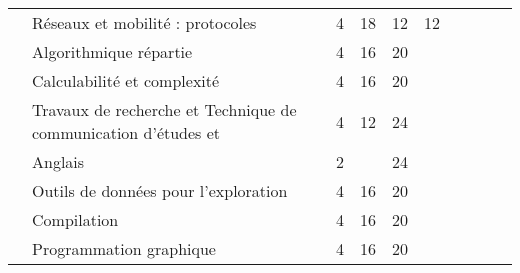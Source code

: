 \begin{tabular}{c|m{6cm}|cm{1cm}|cm{1cm}|cm{1cm}|cm{1cm}|}
 & \color{black} \mbox{Réseaux} \mbox{et} \mbox{mobilité} \mbox{:} \mbox{protocoles}  & \color{black} 4 & \color{black} 18 & \color{black} 12 & \color{black} 12 \\ \cline{2-6}
 & \cellcolor{couleurClaire} \color{couleurTexte} \mbox{Algorithmique} \mbox{répartie}  & \cellcolor{couleurClaire} \color{couleurTexte} 4 & \cellcolor{couleurClaire} \color{couleurTexte} 16 & \cellcolor{couleurClaire} \color{couleurTexte} 20 & \cellcolor{couleurClaire} \color{couleurTexte}  \\ \cline{2-6}
 & \color{black} \mbox{Calculabilité} \mbox{et} \mbox{complexité}  & \color{black} 4 & \color{black} 16 & \color{black} 20 & \color{black}  \\ \cline{2-6}
 & \cellcolor{couleurClaire} \color{couleurTexte} \mbox{Travaux} \mbox{de} \mbox{recherche} \mbox{et} \mbox{Technique} \mbox{de} \mbox{communication} \mbox{d’études} \mbox{et}  & \cellcolor{couleurClaire} \color{couleurTexte} 4 & \cellcolor{couleurClaire} \color{couleurTexte} 12 & \cellcolor{couleurClaire} \color{couleurTexte} 24 & \cellcolor{couleurClaire} \color{couleurTexte}  \\ \cline{2-6}
 & \color{black} \mbox{Anglais}  & \color{black} 2 & \color{black}  & \color{black} 24 & \color{black}  \\ \cline{2-6}
 & \cellcolor{couleurClaire} \color{couleurTexte} \mbox{Outils} \mbox{de} \mbox{données} \mbox{pour} \mbox{l’exploration}  & \cellcolor{couleurClaire} \color{couleurTexte} 4 & \cellcolor{couleurClaire} \color{couleurTexte} 16 & \cellcolor{couleurClaire} \color{couleurTexte} 20 & \cellcolor{couleurClaire} \color{couleurTexte}  \\ \cline{2-6}
 & \color{black} \mbox{Compilation}  & \color{black} 4 & \color{black} 16 & \color{black} 20 & \color{black}  \\ \cline{2-6}
 & \cellcolor{couleurClaire} \color{couleurTexte} \mbox{Programmation} \mbox{graphique}  & \cellcolor{couleurClaire} \color{couleurTexte} 4 & \cellcolor{couleurClaire} \color{couleurTexte} 16 & \cellcolor{couleurClaire} \color{couleurTexte} 20 & \cellcolor{couleurClaire} \color{couleurTexte}  \\ \cline{2-6}
\hline
\end{tabular}
